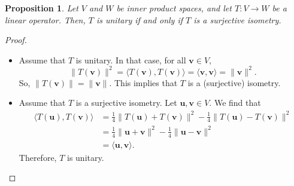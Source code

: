 \documentclass[a4paper, openany]{memoir}
\theoremstyle{definition}
\theoremstyle{plain}
\newtheorem{proposition}[definition]{Proposition}
\begin{document}
    \begin{proposition}
        Let $V$ and $W$ be inner product spaces, and let $T: V \to W$ be a linear operator. Then, $T$ is unitary if and only if $T$ is a surjective isometry.
    \end{proposition}
    \begin{proof}
        \hspace*{0pt}
        \begin{itemize}
            \item Assume that $T$ is unitary. In that case, for all $\bm{v} \in V$,
            \[\lVert T(\bm{v}) \rVert^2 = \langle T(\bm{v}), T(\bm{v}) \rangle = \langle \bm{v}, \bm{v} \rangle = \lVert \bm{v} \rVert^2.\]
            So, $\lVert T(\bm{v}) \rVert = \lVert \bm{v} \rVert$. This implies that $T$ is a (surjective) isometry.

            \item Assume that $T$ is a surjective isometry. Let $\bm{u}, \bm{v} \in V$. We find that
            \begin{align*}
                \langle T(\bm{u}), T(\bm{v}) \rangle &= \frac{1}{4} \lVert T(\bm{u}) + T(\bm{v}) \rVert^2 - \frac{1}{4} \lVert T(\bm{u}) - T(\bm{v}) \rVert^2 \\
                &= \frac{1}{4} \lVert \bm{u} + \bm{v} \rVert^2 - \frac{1}{4} \lVert \bm{u} - \bm{v} \rVert^2 \\
                &= \langle \bm{u}, \bm{v} \rangle.
            \end{align*}
            Therefore, $T$ is unitary.
        \end{itemize}
    \end{proof}
\end{document}
